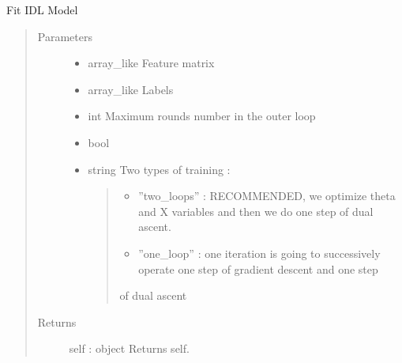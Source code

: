 \documentclass[letterpaper,10pt,english]{sphinxmanual}
\begin{document}
\begin{fulllineitems}
\begin{description}
\end{description}

\begin{fulllineitems}
\label{\detokenize{sections/learning:IDL.IDLModel.fit}}
Fit IDL Model
\begin{quote}\begin{description}
\item[{Parameters}] \leavevmode\begin{itemize}
\item {} 
 \textendash{} array\_like
Feature matrix

\item {} 
 \textendash{} array\_like
Labels

\item {} 
 \textendash{} int
Maximum rounds number in the outer loop

\item {} 
 \textendash{} bool

\item {} 
 \textendash{} 
string
Two types of training :
\begin{quote}
\begin{itemize}
\item {} 
”two\_loops” : RECOMMENDED, we optimize theta and X variables and then we do one step of dual ascent.

\item {} 
”one\_loop” : one iteration is going to successively operate one step of gradient descent and one step

\end{itemize}

of dual ascent
\end{quote}


\end{itemize}

\item[{Returns}] \leavevmode
self : object
Returns self.

\end{description}\end{quote}


\end{fulllineitems}
\end{fulllineitems}
\end{document}
